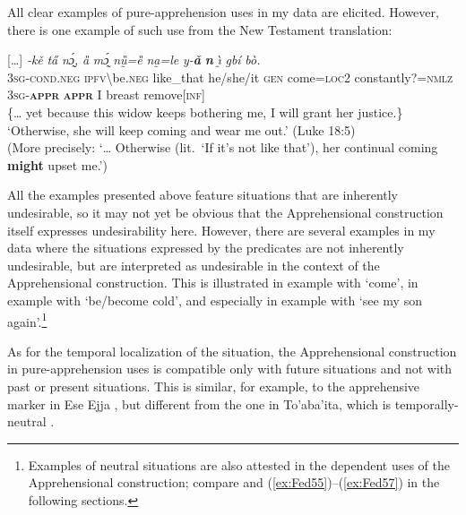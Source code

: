 \documentclass[output=paper,colorlinks,citecolor=brown
]{langscibook}
\begin{document}
 All clear examples of pure-apprehension uses in my data are elicited. However, there is one example of such use from the New Testament translation:

\ea \label{ex:Fed15}
\gll \textup{[}{\ldots}\textup{]} \textit{{\E}-kě} \textit{ta̋} \textit{nɔ̰́,} \textit{ȁ} \textit{mɔ̰́} \textit{nṵ̏=ȅ} \textit{n{\ù}a̰=le} \textit{y-\textbf{ǎ}} \textit{\textbf{n{\ù}}} \textit{ı̰̀} \textit{gbí} \textit{bò.} \\
{} \textsc{3sg-cond.neg} \textsc{ipfv}\backslash be.\textsc{neg} like\_that he/she/it \textsc{gen} come=\textsc{loc2} constantly?=\textsc{nmlz} \textsc{3sg-\textbf{appr}} \textsc{\textbf{appr}} I breast remove[\textsc{inf}] \\
\glt \{{\dots} yet because this widow keeps bothering me, I will grant her justice.\} `Otherwise, she will keep coming and wear me out.' (Luke 18:5) \\
(More precisely: `{\dots} Otherwise (lit.\ `If it's not like that'), her continual coming \textbf{might} upset me.')
\z

All the examples presented above feature situations that are inherently undesirable, so it may not yet be obvious that the Apprehensional construction itself expresses undesirability here. However, there are several examples in my data where the situations expressed by the predicates are not inherently undesirable, but are interpreted as undesirable in the context of the Apprehensional construction. This is illustrated in example  with `come', in example  with `be\slash become cold', and especially in example  with `see my son again'.\footnote{Examples of neutral situations are also attested in the dependent uses of the Apprehensional construction; compare  and (\ref{ex:Fed55})--(\ref{ex:Fed57}) in the following sections.}

\z

 As for the temporal localization of the situation, the Apprehensional construction in pure-apprehension uses is compatible only with future situations and not with past  or present  situations. This is similar, for example, to the apprehensive marker in Ese Ejja \citep[265]{vuillermet2018}, but different from the one in To'aba'ita, which is temporally-neutral \citep[296]{lichtenberk1995}.
\end{document}
